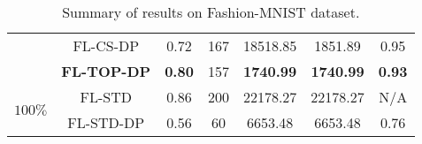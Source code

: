 \documentclass[accepted]{uai2021} %
\begin{document}
\begin{table*}[!ht]
\begin{minipage}{.5\linewidth}
{\begin{tabular}{|c|c|c|c|c|c|c|}
        &  FL-CS-DP  &  0.72  & 167 & 18518.85 & 1851.89 & 0.95\\
        \cline{2-7}
        &  \textbf{FL-TOP-DP}   &  \textbf{0.80} & 157 & \textbf{1740.99} & \textbf{1740.99} & \textbf{0.93}\\
        \hline 
        \hline
        \multirow{2}{*}{$100\%$} &  FL-STD  &  0.86  & 200 & 22178.27 & 22178.27 & N/A  \\
        \cline{2-7}
        &  FL-STD-DP  &  0.56 & 60 & 6653.48  & 6653.48 & 0.76 \\
        \hline
        
    \end{tabular}}
    \caption{Summary of results on Fashion-MNIST dataset.}
    \label{tab:description_results_Fashion_MNIST_reduced}
\vspace{-.3cm}
    \end{minipage}\hfill
    \begin{minipage}{.5\linewidth}
    \centering
\end{minipage}
\end{table*}
\end{document}
